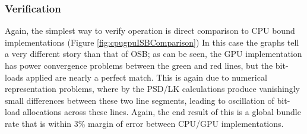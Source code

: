 \subsubsection{Verification}
Again, the simplest way to verify operation is direct comparison to CPU bound implementations (Figure \ref{fig:cpugpuISBComparison}) In this case the graphs tell a very different story than that of OSB; as can be seen, the GPU implementation has power convergence problems between the green and red lines, but the bit-loads applied are nearly a perfect match. This is again due to numerical representation problems, where by the PSD/LK calculations produce vanishingly small differences between these two line segments, leading to oscillation of bit-load allocations across these lines. Again, the end result of this is a global bundle rate that is within 3\% margin of error between CPU/GPU implementations.
